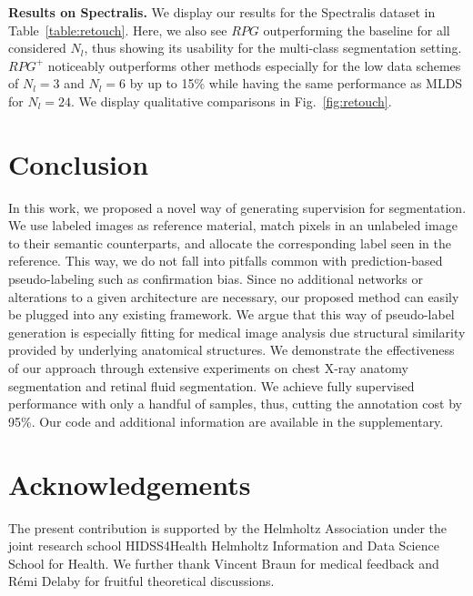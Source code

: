 \documentclass[letterpaper]{article} %
\begin{document}
\noindent\textbf{Results on Spectralis.}
We display our results for the Spectralis dataset in Table~\ref{table:retouch}. Here, we also see $RPG$ outperforming the baseline for all considered $N_l$, thus showing its usability for the multi-class segmentation setting. $RPG^+$ noticeably outperforms other methods especially for the low data schemes of $N_l=3$ and $N_l=6$ by up to 15\% while having the same performance as MLDS for $N_l=24$. We display qualitative comparisons in Fig.~\ref{fig:retouch}.


\section{Conclusion}
In this work, we proposed a novel way of generating supervision for segmentation. We use labeled images as reference material, match pixels in an unlabeled image to their semantic counterparts, and allocate the corresponding label seen in the reference. This way, we do not fall into pitfalls common with prediction-based pseudo-labeling such as confirmation bias.  Since no additional networks or alterations to a given architecture are necessary, our proposed method can easily be plugged into any existing framework. We argue that this way of pseudo-label generation is especially fitting for medical image analysis due structural similarity provided by underlying anatomical structures. We demonstrate the effectiveness of our approach through extensive experiments on chest X-ray anatomy segmentation and retinal fluid segmentation. We achieve fully supervised performance with only a handful of samples, thus, cutting the annotation cost by 95\%. Our code and additional information are available in the supplementary.

\section{Acknowledgements}
The present contribution is supported by the Helmholtz Association under the joint research school HIDSS4Health  Helmholtz Information and Data Science School for Health. We further thank Vincent Braun for medical feedback and R\'emi Delaby for fruitful theoretical discussions.
\end{document}
